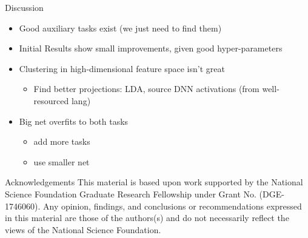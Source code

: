 \documentclass[final]{beamer} %
\begin{document}
\begin{frame}
\begin{columns}
\begin{column}{0.23\textwidth}
{        \vfill


                \begin{block}{\boxnumber Discussion}
          \begin{itemize}
          \item Good auxiliary tasks exist (we just need to find them)
          \item Initial Results show small improvements, given good hyper-parameters
          \item Clustering in high-dimensional feature space isn't great
                  \begin{itemize}
                  \item Find better projections: LDA, source DNN activations (from well-resourced lang)
                  \end{itemize}
                \item Big net overfits to both tasks
                            \begin{itemize}
                            \item add more tasks
                            \item use smaller net
                            \end{itemize}
          \end{itemize}
        \end{block}        

        \vfill
        


        
        
        \begin{block}{\boxnumber Acknowledgements}
          \footnotesize{This material is based upon work supported by the National Science Foundation Graduate Research Fellowship under Grant No. (DGE-1746060). Any opinion, findings, and conclusions or recommendations expressed in this material are those of the authors(s) and do not necessarily reflect the views of the National Science Foundation.}
        \end{block}

        \vfill
        
        }%
    \end{column}
    
  \end{columns}
\end{frame}
\end{document}
